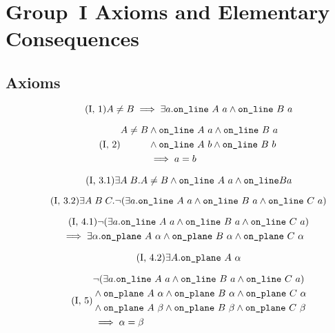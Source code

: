 \chapter{Group~I Axioms and Elementary Consequences}\label{app:group1}

\section{Axioms}
\begin{equation}\label{eq:g11}
  \tag{I, 1}
    A \neq B \implies \exists a. \texttt{on\_line}\ A\ a \wedge \texttt{on\_line}\ B\ a
\end{equation}

\begin{equation}\label{eq:g12}
  \tag{I, 2}
  \begin{split}
    A \neq B &\wedge \code{on\_line}\ A\ a \wedge \code{on\_line}\ B\ a\\
    &\wedge \code{on\_line}\ A\ b \wedge \code{on\_line}\ B\ b\\
    &\implies a = b
  \end{split}
\end{equation}

\begin{equation}\label{eq:g13a}
  \tag{I, 3.1}
  \exists A\; B. A \neq B \wedge \texttt{on\_line}\ A\ a \wedge \texttt{on\_line} B a
\end{equation}

\begin{equation}\label{eq:g13b}
  \tag{I, 3.2}
  \exists A\; B\; C. \neg(\exists a.\texttt{on\_line}\ A\ a\wedge \texttt{on\_line}\ B\ a\wedge \texttt{on\_line}\ C\ a)
\end{equation}

\begin{multline}\label{eq:g14a}
  \tag{I, 4.1}
  \neg(\exists a.\texttt{on\_line}\ A\ a\wedge \texttt{on\_line}\ B\ a\wedge \texttt{on\_line}\ C\ a)\\\quad \implies \exists \alpha. \texttt{on\_plane}\ A\ \alpha \wedge \texttt{on\_plane}\ B\ \alpha \wedge \texttt{on\_plane}\ C\ \alpha
\end{multline}

\begin{equation}\label{eq:g14b}
  \tag{I, 4.2}
  \exists A. \texttt{on\_plane}\ A\ \alpha
\end{equation}

\begin{equation}\label{eq:g15}
  \tag{I, 5}
  \begin{split}
    &\Triangle{a}{A}{B}{C}\\
    &\wedge \code{on\_plane}\ A\ \alpha \wedge \code{on\_plane}\ B\ \alpha \wedge \code{on\_plane}\ C\ \alpha\\
    &\wedge \code{on\_plane}\ A\ \beta \wedge \code{on\_plane}\ B\ \beta \wedge \code{on\_plane}\ C\ \beta\\
    &\implies \alpha = \beta
  \end{split}
\end{equation}

